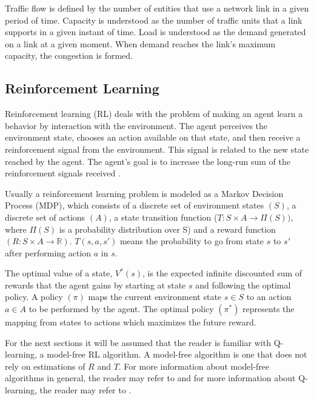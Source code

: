 \documentclass[12pt]{article}
\begin{document}
Traffic flow is defined by the number of entities that use a network link in a given period of time. Capacity is understood as the number of traffic units that a link supports in a given instant of time. Load is understood as the demand generated on a link at a given moment. When demand reaches the link's maximum capacity, the congestion is formed.

\subsection{Reinforcement Learning}

Reinforcement learning (RL) deals with the problem of making an agent learn a behavior by interaction with the environment. The agent perceives the environment state, chooses an action available on that state, and then receive a reinforcement signal from the environment. This signal is related to the new state reached by the agent. The agent's goal is to increase the long-run sum of the reinforcement signals received \cite{Kaelbling+1996}.

Usually a reinforcement learning problem is modeled as a Markov Decision Process (MDP), which consists of a discrete set of environment states $(S)$, a discrete set of actions $(A)$, a state transition function ($T: S \times A \to \Pi(S))$, where $\Pi(S)$ is a probability distribution over S) and a reward function $(R: S \times A \to \mathbb{R})$. $T(s, a, s')$ means the probability to go from state $s$ to $s'$ after performing action $a$ in $s$.

The optimal value of a state, $V^*(s)$, is the expected infinite discounted sum of rewards that the agent gains by starting at state $s$ and following the optimal policy. A policy $(\pi)$ maps the current environment state $s \in S$ to an action $a \in A$ to be performed by the agent. The optimal policy $(\pi^*)$ represents the mapping from states to actions which maximizes the future reward.

For the next sections it will be assumed that the reader is familiar with Q-learning, a model-free RL algorithm. A model-free algorithm is one that does not rely on estimations of $R$ and $T$. For more information about model-free algorithms in general, the reader may refer to \cite{Kaelbling+2006} and for more information about Q-learning, the reader may refer to  \cite{Watkins&Dayan1992}.
\end{document}
